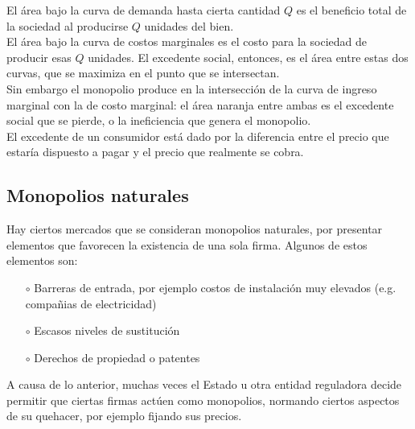 El área bajo la curva de demanda hasta cierta cantidad $Q$ es el beneficio total de la sociedad al producirse $Q$ unidades del bien.\\

El área bajo la curva de costos marginales es el costo para la sociedad de producir esas $Q$ unidades.\newline
El excedente social, entonces, es el área entre estas dos curvas, que se maximiza en el punto que se intersectan.\\

Sin embargo el monopolio produce en la intersección de la curva de ingreso marginal con la de costo marginal: el área naranja entre ambas es el excedente social que se pierde, o la ineficiencia que genera el monopolio.\\ 

El excedente de un consumidor está dado por la diferencia entre el precio que estaría dispuesto a pagar y el precio que realmente se cobra.

\subsection{Monopolios naturales}
Hay ciertos mercados que se consideran monopolios naturales, por presentar elementos que favorecen la existencia de una sola firma. Algunos de estos elementos son:

\begin{itemize}
    \item[$\circ$] Barreras de entrada, por ejemplo costos de instalación muy elevados (e.g. compañias de electricidad)
    
    \item[$\circ$] Escasos niveles de sustitución
    
    \item[$\circ$] Derechos de propiedad o patentes
\end{itemize}

A causa de lo anterior, muchas veces el Estado u otra entidad reguladora decide permitir que ciertas firmas actúen como monopolios, normando ciertos aspectos de su quehacer, por ejemplo fijando sus precios.
\newpage
